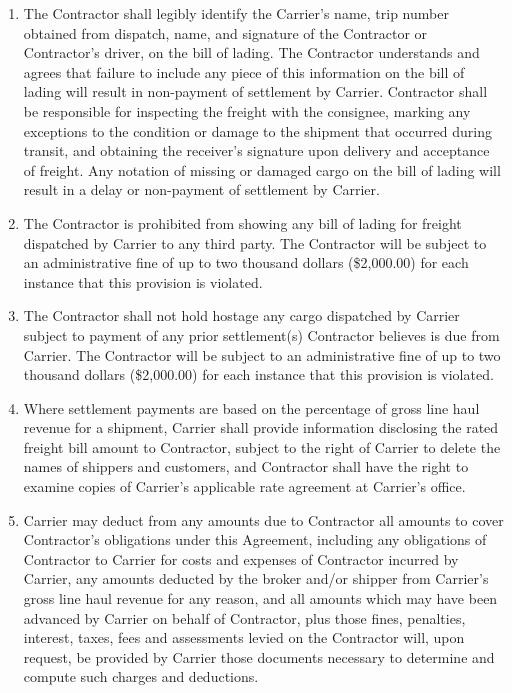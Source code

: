 \begin{enumerate}[ 
    ref = \SecondLevelEnumerator
]
    \item The Contractor shall legibly identify the Carrier's name, trip
    number obtained from dispatch, name, and signature of the Contractor or
    Contractor's driver, on the bill of lading. The Contractor understands
    and agrees that failure to include any piece of this information on the
    bill of lading will result in non-payment of settlement by Carrier.
    Contractor shall be responsible for inspecting the freight with the
    consignee, marking any exceptions to the condition or damage to the
    shipment that occurred during transit, and obtaining the receiver's
    signature upon delivery and acceptance of freight. Any notation of
    missing or damaged cargo on the bill of lading will result in a delay
    or non-payment of settlement by Carrier.

    \item The Contractor is prohibited from showing any bill of lading for
    freight dispatched by Carrier to any third party. The Contractor will
    be subject to an administrative fine of up to two thousand dollars
    (\$2,000.00) for each instance that this provision is violated.

    \item The Contractor shall not hold hostage any cargo dispatched by
    Carrier subject to payment of any prior settlement(s) Contractor
    believes is due from Carrier. The Contractor will be subject to an
    administrative fine of up to two thousand dollars (\$2,000.00) for each
    instance that this provision is violated.

    \item Where settlement payments are based on the percentage of gross
    line haul revenue for a shipment, Carrier shall provide information
    disclosing the rated freight bill amount to Contractor, subject to the
    right of Carrier to delete the names of shippers and customers, and
    Contractor shall have the right to examine copies of Carrier's
    applicable rate agreement at Carrier's office.

    \item Carrier may deduct from any amounts due to Contractor all amounts
    to cover Contractor's obligations under this Agreement, including any
    obligations of Contractor to Carrier for costs and expenses of
    Contractor incurred by Carrier, any amounts deducted by the broker
    and/or shipper from Carrier's gross line haul revenue for any reason,
    and all amounts which may have been advanced by Carrier on behalf of
    Contractor, plus those fines, penalties, interest, taxes, fees and
    assessments levied on the Contractor will, upon request, be provided by
    Carrier those documents necessary to determine and compute such charges
    and deductions.
\end{enumerate}